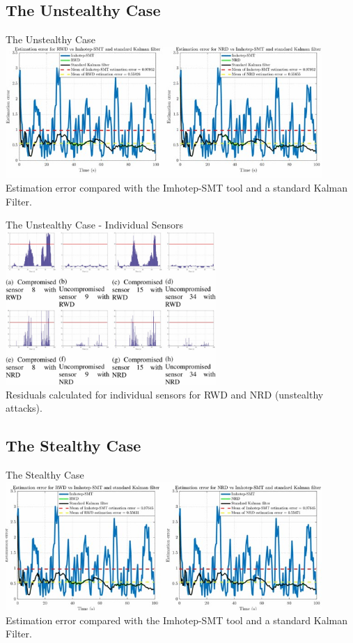 \documentclass[aspectratio=169]{beamer}
\begin{document}
\subsection{The Unstealthy Case}
\begin{frame}{The Unstealthy Case}
	\centering
	\includegraphics[width=0.9\textwidth]{Images/Sim_Error_Comparrision_Unstealthy}\\
	
	Estimation error compared with the {Imhotep-SMT tool \cite{Imhotep_SMT}} and a standard Kalman Filter.
\end{frame}

\begin{frame}{The Unstealthy Case - Individual Sensors}
	\centering
	\includegraphics[width=0.6\textwidth]{Images/Sim_Error_Sensors}\\
	
	Residuals calculated for individual sensors for RWD and NRD (unstealthy attacks).
\end{frame}


\subsection{The Stealthy Case}
\begin{frame}{The Stealthy Case}
	\centering
	\includegraphics[width=0.9\textwidth]{Images/Sim_Error_Comparrision_Stealthy}\\
	Estimation error compared with the {Imhotep-SMT tool \cite{Imhotep_SMT}} and a standard Kalman Filter.
\end{frame}
\end{document}
